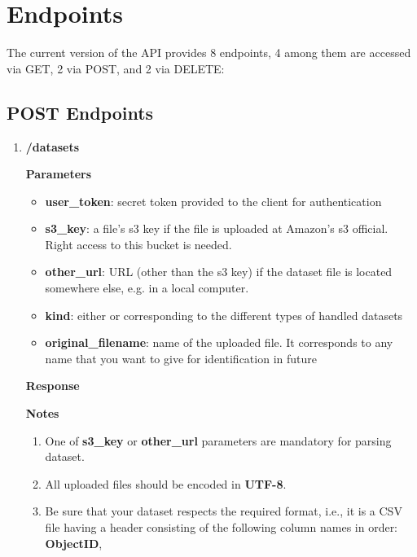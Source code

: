 \documentclass[a4paper,10pt]{scrartcl}
\begin{document}
\section{Endpoints}
The current version of the API provides 8 endpoints, 4 among them are accessed via GET, 2 via POST, and 2 via DELETE:
\subsection{POST Endpoints}
\begin{enumerate}
 \item \textbf{/datasets}
\textbf{Parameters}
\begin{itemize}
\item \textbf{user\_token}: secret token provided to the client for authentication 
\item \textbf{s3\_key}: a file's s3 key if the file is uploaded at Amazon's s3 official. Right access to this bucket 
is needed.
\item \textbf{other\_url}: URL (other than the s3 key) if the dataset file is located somewhere else, e.g. in a local computer.
\item \textbf{kind}: either  or  corresponding to the different types of handled datasets
\item \textbf{original\_filename}: name of the uploaded file. It corresponds to any name that you want to give for identification
in future
\end{itemize}
\textbf{Response}
\textbf{Notes}
\begin{enumerate}
 \item One of \textbf{s3\_key} or \textbf{other\_url} parameters are mandatory for parsing dataset. 
 \item All uploaded files should be encoded in \textbf{UTF-8}.
 \item Be sure that your dataset respects the required format, i.e., it is a CSV file 
 having a header consisting of the following column names in order: \textbf{ObjectID},

\end{enumerate}
\end{enumerate}
\end{document}
